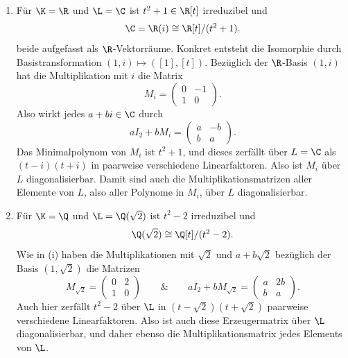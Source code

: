 \documentclass[11pt, a4paper]{article}
\begin{document}
\begin{example} \label{ex: einfache Erweiterungen}\mbox{}
    \begin{enumerate}[label=(\roman*)]
        \item Für $\K = \R$ und $\L = \C$ ist $t^2+1 \in \R[t]$ irreduzibel und
        $$\C = \R(i) \cong \R[t]/(t^2+1).$$
        beide aufgefasst als $\R$-Vektorräume. Konkret entsteht die Isomorphie durch Basistransformation $(1,i) \longmapsto ([1],[t])$. Bezüglich der $\R$-Basis $(1,i)$ hat die Multiplikation mit $i$ die Matrix
        $$M_i = \begin{pmatrix} 0 & -1 \\ 1 & 0 \end{pmatrix}.$$
        Also wirkt jedes $a+bi \in \C$ durch
        $$aI_2 + bM_i = \begin{pmatrix} a & -b \\ b & a \end{pmatrix}.$$
        Das Minimalpolynom von $M_i$ ist $t^2+1$, und dieses zerfällt über $L = \C$ als $(t-i)(t+i)$ in paarweise verschiedene Linearfaktoren. Also ist $M_i$ über $L$ diagonalisierbar. Damit sind auch die Multiplikationsmatrizen aller Elemente von $L$, also aller Polynome in $M_i$, über $L$ diagonalisierbar.

        
        \item Für $\K = \Q$ und $\L = \Q(\sqrt2)$ ist $t^2-2$ irreduzibel und
        $$\Q(\sqrt2) \cong \Q[t]/(t^2-2).$$
        Wie in (i) haben die Multiplikationen mit $\sqrt2$ und $a+b\sqrt{2}$ bezüglich der Basis $(1,\sqrt2)$ die Matrizen
        $$M_{\sqrt2} = \begin{pmatrix} 0 & 2 \\ 1 & 0 \end{pmatrix} \qquad \& \qquad aI_2 + bM_{\sqrt2} = \begin{pmatrix} a & 2b \\ b & a \end{pmatrix}.$$
        Auch hier zerfällt $t^2-2$ über $\L$ in $(t-\sqrt2)(t+\sqrt2)$ paarweise verschiedene Linearfaktoren. Also ist auch diese Erzeugermatrix über $\L$ diagonalisierbar, und daher ebenso die Multiplikationsmatrix jedes Elements von $\L$.
        

\end{enumerate}
\end{example}
\end{document}
